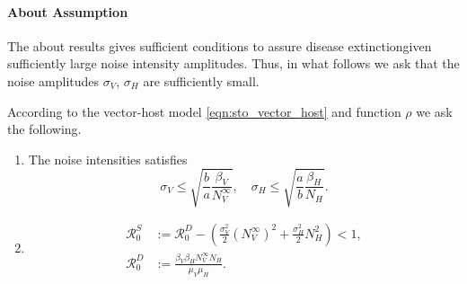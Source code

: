 \paragraph{About Assumption}
The about results gives sufficient conditions to assure 
disease extinction\textemdash given sufficiently large noise intensity 
amplitudes. Thus, in what follows we ask that the noise amplitudes 
$\sigma_V$, $\sigma_H$ are sufficiently small.
\begin{assumption}\label{ass:extintion}
    According to the vector-host model \eqref{eqn:sto_vector_host} and 
    function
    $\rho$
    we ask the following.
    \begin{enumerate}[(E\textendash1)]
        \item \label{ass:noise_condition}
            The noise intensities satisfies
            $$
                \sigma_V \leq 
                    \sqrt{
                        \frac{b}{a}
                        \frac{\beta_V}{N_V^{\infty}}
                        },
                 \quad
                \sigma_H \leq
                    \sqrt{
                        \frac{a}{b}
                        \frac{\beta_H }{N_H
                    }}.
            $$
        \item
            \begin{equation*}
                \begin{aligned}
                    \mathcal{R}_0 ^ S &:=
                        \mathcal{R}_0^D - 
                        \left( 
                            \frac{\sigma_V ^ 2}{2} (N_V ^ {\infty}) ^ 2
                            +
                            \frac{\sigma_H ^ 2}{2} N_H ^ 2
                        \right)
                        <1,
                        \\
                    \mathcal{R}_0 ^ D &:=
                            \frac{\beta_V \beta_H N_V ^ \infty 
                            N_H}{\mu_V \mu_H} .
                \end{aligned}
            \end{equation*}
    \end{enumerate}
\end{assumption}        
%
%
%
%
